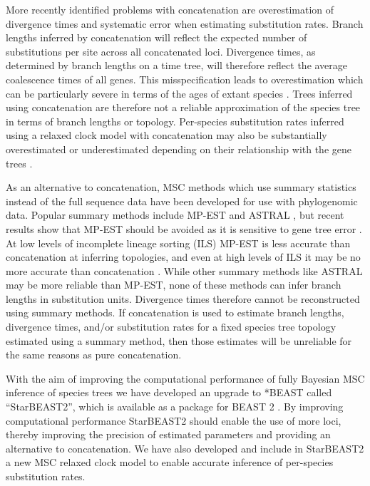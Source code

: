 \documentclass[nogrid]{MBE}%
\begin{document}
More recently identified problems with concatenation are overestimation of
divergence times and systematic error when estimating substitution rates. Branch lengths
inferred by concatenation will reflect the expected number of substitutions per
site across all concatenated loci. Divergence times, as determined by branch
lengths on a time tree, will therefore reflect the average coalescence times of
all genes. This misspecification leads to overestimation which can be
particularly severe in terms of the ages of extant species
\citep{Ogilvie01052016}. Trees inferred using concatenation are therefore not a
reliable approximation of the species tree in terms of branch lengths or
topology. Per-species substitution rates inferred using a relaxed clock model
with concatenation may also be substantially overestimated or underestimated
depending on their relationship with the gene trees \citep{Mendes28022016}.

As an alternative to concatenation, MSC methods which use summary statistics instead
of the full sequence data have been developed for use with phylogenomic data.
Popular summary methods include MP-EST and ASTRAL \citep{Liu2010,
Mirarab01092014}, but recent results show that MP-EST should be avoided as it is
sensitive to gene tree error \citep{Mirarab15062015, Xi201563}. At low levels of
incomplete lineage sorting (ILS) MP-EST is less accurate than concatenation at
inferring topologies, and even at high levels of ILS it may be no more accurate
than concatenation \citep{Ogilvie01052016}. While other summary methods like
ASTRAL may be more reliable than MP-EST, none of these methods can infer branch
lengths in substitution units. Divergence times therefore cannot be
reconstructed using summary methods. If concatenation is used to estimate branch
lengths, divergence times, and/or substitution rates for a fixed species tree
topology estimated using a summary method, then those estimates will be
unreliable for the same reasons as pure concatenation.

With the aim of improving the computational performance of fully Bayesian
MSC inference of species trees we have developed an upgrade
to *BEAST called ``StarBEAST2'', which is available as a package for BEAST 2
\citep{10.1371/journal.pcbi.1003537}. By improving computational performance
StarBEAST2 should enable the use of more loci, thereby improving the precision
of estimated parameters and providing an alternative to concatenation. We have
also developed and include in StarBEAST2 a new MSC relaxed
clock model to enable accurate inference of per-species substitution rates.
\end{document}
